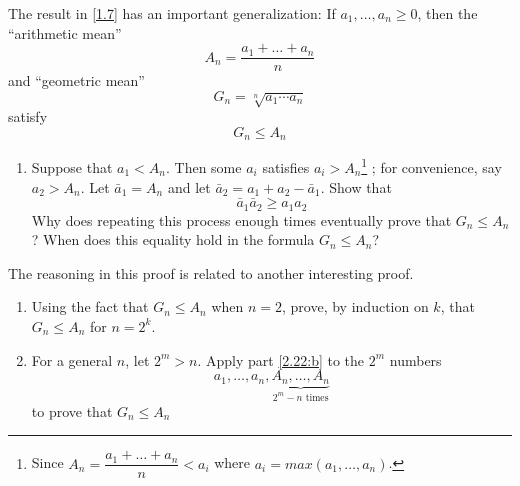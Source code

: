 \begin{pr} \label{2.22} %
  The result in \autoref{1.7} has an important generalization:
  If $a_1,\ldots,a_n \geq 0$, then the ``arithmetic mean''
  \begin{equation*}
    A_n = \frac{a_1 + \dots + a_n}{n}
  \end{equation*}
  and ``geometric mean''
  \begin{equation*}
    G_n = \sqrt[n]{a_1 \cdots a_n}
  \end{equation*}
  satisfy
  \begin{equation*}
    G_n \leq A_n
  \end{equation*}
  \begin{enumerate}[label=(\alph*)]
    \item Suppose that $a_1 < A_n$. Then some $a_i$ satisfies
    $a_i > A_n$\footnote{Since
    $A_n = \dfrac{a_1 + \dots + a_n}{n} < a_i$ where
    $a_i = max(a_1,\dots,a_n)$.}%
    ; for convenience, say $a_2 > A_n$. Let
    $\bar{a}_1 = A_n$ and let $\bar{a}_2 = a_1 + a_2
    - \bar{a}_1$. Show that
    \begin{equation*}
      \bar{a}_1 \bar{a}_2 \geq a_1 a_2
    \end{equation*}
    Why does repeating this process enough times eventually
    prove that $G_n \leq A_n$? When does this equality
    hold in the formula $G_n \leq A_n$?
  \end{enumerate}
  The reasoning in this proof is related to another
  interesting proof.
  \begin{enumerate}[label=(\alph*),resume]
    \item \label{2.22:b}
    Using the fact that $G_n \leq A_n$ when $n = 2$,
    prove, by induction on $k$, that $G_n \leq A_n$ for
    $n = 2^k$.
    \item For a general $n$, let $2^m > n$. Apply part
    \ref{2.22:b} to the $2^m$ numbers
    \begin{equation*}
      a_1,\dots,a_n,
      \underbrace{A_n,\dots,A_n}_\text{$2^m - n$ times}
    \end{equation*}
    to prove that $G_n \leq A_n$
  \end{enumerate}
\end{pr}

